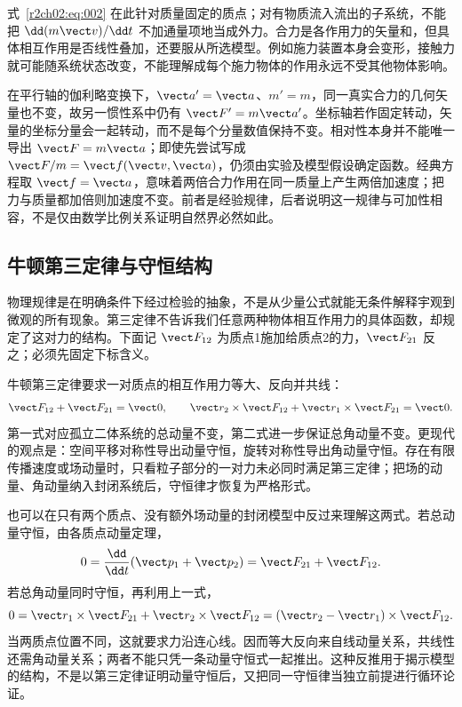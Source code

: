 式~\eqref{r2ch02:eq:002} 在此针对质量固定的质点；对有物质流入流出的子系统，不能把 $\dd(m\vect v)/\dd t$ 不加通量项地当成外力。合力是各作用力的矢量和，但具体相互作用是否线性叠加，还要服从所选模型。例如施力装置本身会变形，接触力就可能随系统状态改变，不能理解成每个施力物体的作用永远不受其他物体影响。

在平行轴的伽利略变换下，$\vect a'=\vect a$、$m'=m$，同一真实合力的几何矢量也不变，故另一惯性系中仍有 $\vect F'=m\vect a'$。坐标轴若作固定转动，矢量的坐标分量会一起转动，而不是每个分量数值保持不变。相对性本身并不能唯一导出 $\vect F=m\vect a$；即使先尝试写成 $\vect F/m=\vect f(\vect v,\vect a)$，仍须由实验及模型假设确定函数。经典方程取 $\vect f=\vect a$，意味着两倍合力作用在同一质量上产生两倍加速度；把力与质量都加倍则加速度不变。前者是经验规律，后者说明这一规律与可加性相容，不是仅由数学比例关系证明自然界必然如此。

\subsection{牛顿第三定律与守恒结构}
\label{r2ch02:sec:newton-third}

物理规律是在明确条件下经过检验的抽象，不是从少量公式就能无条件解释宇观到微观的所有现象。第三定律不告诉我们任意两种物体相互作用力的具体函数，却规定了这对力的结构。下面记 $\vect F_{12}$ 为质点1施加给质点2的力，$\vect F_{21}$ 反之；必须先固定下标含义。

牛顿第三定律要求一对质点的相互作用力等大、反向并共线：
\begin{equation}
 \vect F_{12}+\vect F_{21}=\vect0,\qquad
 \vect r_2\times\vect F_{12}+\vect r_1\times\vect F_{21}=\vect0.
 \label{r2ch02:eq:003}
\end{equation}
第一式对应孤立二体系统的总动量不变，第二式进一步保证总角动量不变。更现代的观点是：空间平移对称性导出动量守恒，旋转对称性导出角动量守恒。存在有限传播速度或场动量时，只看粒子部分的一对力未必同时满足第三定律；把场的动量、角动量纳入封闭系统后，守恒律才恢复为严格形式。

也可以在只有两个质点、没有额外场动量的封闭模型中反过来理解这两式。若总动量守恒，由各质点动量定理，
\[
 0=\frac{\dd}{\dd t}(\vect p_1+\vect p_2)
 =\vect F_{21}+\vect F_{12}.
\]
若总角动量同时守恒，再利用上一式，
\[
 0=\vect r_1\times\vect F_{21}+\vect r_2\times\vect F_{12}
 =(\vect r_2-\vect r_1)\times\vect F_{12}.
\]
当两质点位置不同，这就要求力沿连心线。因而等大反向来自线动量关系，共线性还需角动量关系；两者不能只凭一条动量守恒式一起推出。这种反推用于揭示模型的结构，不是以第三定律证明动量守恒后，又把同一守恒律当独立前提进行循环论证。

